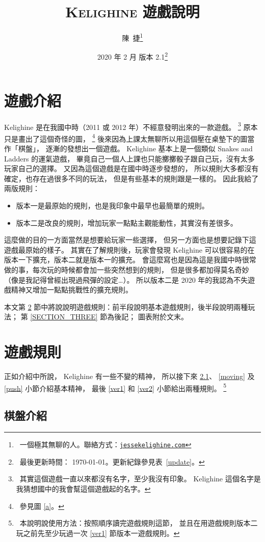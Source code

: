 \documentclass[11pt,a4paper]{article}
\title{\textsc{Kelighine} 遊戲說明}
\author{陳\ 捷\thanks{\ 一個極其無聊的人。聯絡方式：\href{https://jessekelighine.com}{\texttt{jessekelighine.com}}}}
\date{2020 年 2 月 \quad 版本 2.1\thanks{\ 最後更新時間： \today。更新紀錄參見表\ \ref{update}。}}
\begin{document}
\maketitle

\section{遊戲介紹} %

Kelighine 是在我國中時（2011 或 2012 年）不經意發明出來的一款遊戲。
	\footnote{\ 其實這個遊戲一直以來都沒有名字，至少我沒有印象。
	Kelighine 這個名字是我猜想國中的我會幫這個遊戲起的名字。}
原本只是畫出了這個奇怪的圖，
	\footnote{\ 參見圖 \ref{a}。}
後來因為上課太無聊所以用這個壓在桌墊下的圖當作「棋盤」，
逐漸的發想出一個遊戲。
Kelighine 基本上是一個類似 Snakes and Ladders 的運氣遊戲，
畢竟自己一個人上課也只能擲擲骰子跟自己玩，沒有太多玩家自己的選擇。
又因為這個遊戲是在國中時逐步發想的，
所以規則大多都沒有確定，也存在過很多不同的玩法，
但是有些基本的規則跟是一樣的。
因此我給了兩版規則：
\begin{itemize}
	\item 版本一是最原始的規則，也是我印象中最早也最簡單的規則。
	\item 版本二是改良的規則，增加玩家一點點主觀能動性，其實沒有差很多。
\end{itemize}
這麼做的目的一方面當然是想要給玩家一些選擇，
但另一方面也是想要記錄下這遊戲最原始的樣子。
其實在了解規則後，玩家會發現 Kelighine 可以很容易的在版本一下擴充，版本二就是版本一的擴充。
會這麼寫也是因為這是我國中時很常做的事，每次玩的時候都會加一些突然想到的規則，
但是很多都加得莫名奇妙（像是我記得曾經出現過飛彈的設定…）。
所以版本二是 2020 年的我認為不失遊戲精神又增加一點點挑戰性的擴充規則。

本文第 \ref{SECTION_TWO} 節中將說說明遊戲規則：前半段說明基本遊戲規則，後半段說明兩種玩法；
第 \ref{SECTION_THREE} 節為後記；
圖表附於文末。

\section{遊戲規則} \label{SECTION_TWO}%

正如介紹中所說， Kelighine 有一些不變的精神，
所以接下來 \ref{board_intro}、 \ref{moving} 及 \ref{push} 小節介紹基本精神，
最後 \ref{ver1} 和 \ref{ver2} 小節給出兩種規則。
	\footnote{\ 本說明說使用方法：按照順序讀完遊戲規則這節，
	並且在用遊戲規則版本二玩之前先至少玩過一次 \ref{ver1} 節版本一遊戲規則。}

\subsection{棋盤介紹} \label{board_intro} %
\end{document}
